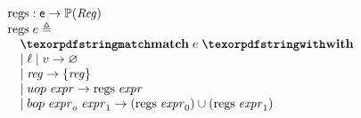 \[
\inarr{
  \regs : \Expr \rightarrow \Pset(\Reg) \\
  \regs \; e \defeq \\
  \quad \kw{match} \; e \; \kw{with} \\
  \quad | \; \loc \; | \; \val \rightarrow \emptyset \\
  \quad | \; \reg \rightarrow \{\reg\} \\
  \quad | \; uop \; \expr \rightarrow \regs \; \expr \\
  \quad | \; bop \; \expr_o \; \expr_1 \rightarrow (\regs \; \expr_0) \cup (\regs \; \expr_1) \\
}\]
